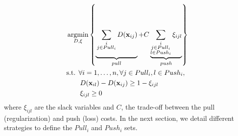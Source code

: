 \begin{equation}
\begin{aligned}
&\displaystyle 		\argmin_{D,\xi} \left\lbrace \underbrace{
	\vphantom{ \sum\limits_{\substack{i \\ j \in Pull_i \\ l \in Push_i}}  \xi_{ijl} }
	\sum_{\substack{i \\ j \in Pull_i}}D(\textbf{x}_{ij})
}_{pull}
+ C
\underbrace{
	\sum\limits_{\substack{i \\ j \in Pull_i \\ l \in Push_i}} \xi_{ijl}
}
_{push} \right\rbrace  \\
&\text{s.t.  } \forall i = 1, \ldots, n, \forall j \in Pull_i, l \in Push_i, \\
& \qquad D(\textbf{x}_{il})-D(\textbf{x}_{ij}) \geq 1-\xi_{ijl} \\
& \qquad \xi_{ijl} \geq 0 
\label{eq:OriginalOptimizationProblem_Objective} 
\end{aligned}
\end{equation}
\noindent where $\xi_{ijl}$ are the slack variables and $C$, the trade-off between the pull (regularization) and push (loss) costs. In the next section, we detail different strategies to define the $Pull_i$ and $Push_i$ sets. 




